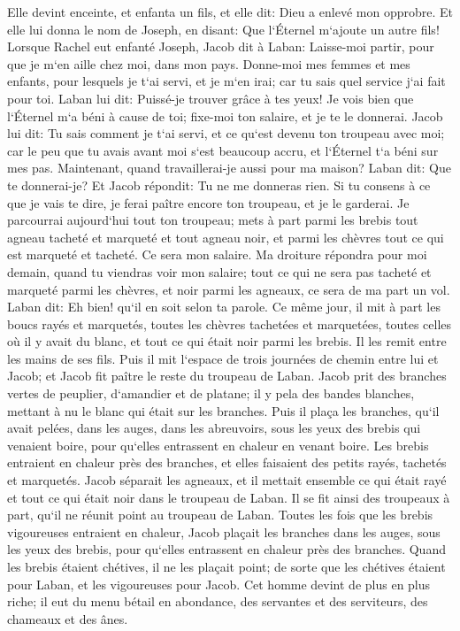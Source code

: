 \verse Elle devint enceinte, et enfanta un fils, et elle dit: Dieu a enlevé mon opprobre. 
\verse Et elle lui donna le nom de Joseph, en disant: Que l`Éternel m`ajoute un autre fils! 
\verse Lorsque Rachel eut enfanté Joseph, Jacob dit à Laban: Laisse-moi partir, pour que je m`en aille chez moi, dans mon pays. 
\verse Donne-moi mes femmes et mes enfants, pour lesquels je t`ai servi, et je m`en irai; car tu sais quel service j`ai fait pour toi. 
\verse Laban lui dit: Puissé-je trouver grâce à tes yeux! Je vois bien que l`Éternel m`a béni à cause de toi; 
\verse fixe-moi ton salaire, et je te le donnerai. 
\verse Jacob lui dit: Tu sais comment je t`ai servi, et ce qu`est devenu ton troupeau avec moi; 
\verse car le peu que tu avais avant moi s`est beaucoup accru, et l`Éternel t`a béni sur mes pas. Maintenant, quand travaillerai-je aussi pour ma maison? 
\verse Laban dit: Que te donnerai-je? Et Jacob répondit: Tu ne me donneras rien. Si tu consens à ce que je vais te dire, je ferai paître encore ton troupeau, et je le garderai. 
\verse Je parcourrai aujourd`hui tout ton troupeau; mets à part parmi les brebis tout agneau tacheté et marqueté et tout agneau noir, et parmi les chèvres tout ce qui est marqueté et tacheté. Ce sera mon salaire. 
\verse Ma droiture répondra pour moi demain, quand tu viendras voir mon salaire; tout ce qui ne sera pas tacheté et marqueté parmi les chèvres, et noir parmi les agneaux, ce sera de ma part un vol. 
\verse Laban dit: Eh bien! qu`il en soit selon ta parole. 
\verse Ce même jour, il mit à part les boucs rayés et marquetés, toutes les chèvres tachetées et marquetées, toutes celles où il y avait du blanc, et tout ce qui était noir parmi les brebis. Il les remit entre les mains de ses fils. 
\verse Puis il mit l`espace de trois journées de chemin entre lui et Jacob; et Jacob fit paître le reste du troupeau de Laban. 
\verse Jacob prit des branches vertes de peuplier, d`amandier et de platane; il y pela des bandes blanches, mettant à nu le blanc qui était sur les branches. 
\verse Puis il plaça les branches, qu`il avait pelées, dans les auges, dans les abreuvoirs, sous les yeux des brebis qui venaient boire, pour qu`elles entrassent en chaleur en venant boire. 
\verse Les brebis entraient en chaleur près des branches, et elles faisaient des petits rayés, tachetés et marquetés. 
\verse Jacob séparait les agneaux, et il mettait ensemble ce qui était rayé et tout ce qui était noir dans le troupeau de Laban. Il se fit ainsi des troupeaux à part, qu`il ne réunit point au troupeau de Laban. 
\verse Toutes les fois que les brebis vigoureuses entraient en chaleur, Jacob plaçait les branches dans les auges, sous les yeux des brebis, pour qu`elles entrassent en chaleur près des branches. 
\verse Quand les brebis étaient chétives, il ne les plaçait point; de sorte que les chétives étaient pour Laban, et les vigoureuses pour Jacob. 
\verse Cet homme devint de plus en plus riche; il eut du menu bétail en abondance, des servantes et des serviteurs, des chameaux et des ânes. 

